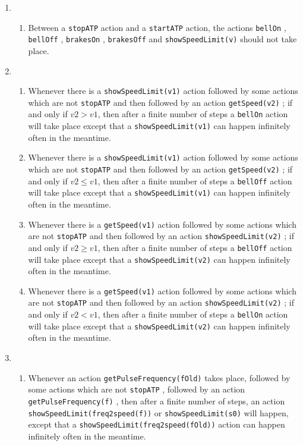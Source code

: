 \documentclass[11pt,a4paper]{article}
\newcommand{\stopATP}{\texttt{stopATP} }
\newcommand{\startATP}{\texttt{startATP} }
\newcommand{\getSpeed}[1]{\texttt{getSpeed(#1)} }
\newcommand{\getPulseFrequency}[1]{\texttt{getPulseFrequency(#1)} }
\newcommand{\showSpeedLimit}[1]{\texttt{showSpeedLimit(#1)} }
\newcommand{\bellOn}{\texttt{bellOn} }
\newcommand{\bellOff}{\texttt{bellOff} }
\newcommand{\brakesOn}{\texttt{brakesOn} }
\newcommand{\brakesOff}{\texttt{brakesOff} }
\begin{document}
\begin{enumerate}
	\item
	\begin{enumerate}
	
	\item Between a \stopATP action and a \startATP action, the actions \bellOn, \bellOff, \brakesOn, \brakesOff and \showSpeedLimit{v} should not take place.
	\end{enumerate}
    \item 
    \begin{enumerate}
    	\item Whenever there is a \showSpeedLimit{v1} action followed by some actions which are not \stopATP and then followed by an action \getSpeed{v2}; if and only if $v2>v1$, then after a finite number of steps a \bellOn action will take place except that a \showSpeedLimit{v1} can happen infinitely often in the meantime.
    	
    	\item Whenever there is a \showSpeedLimit{v1} action followed by some actions which are not \stopATP and then followed by an action \getSpeed{v2}; if and only if $v2 \leq v1$, then after a finite number of steps a \bellOff action will take place except that a \showSpeedLimit{v1} can happen infinitely often in the meantime.
			
			\item Whenever there is a \getSpeed{v1} action followed by some actions which are not \stopATP and then followed by an action \showSpeedLimit{v2}; if and only if $ v2 \geq v1$, then after a finite number of steps a \bellOff action will take place except that a \showSpeedLimit{v2} can happen infinitely often in the meantime.
			
			\item Whenever there is a \getSpeed{v1} action followed by some actions which are not \stopATP and then followed by an action \showSpeedLimit{v2}; if and only if $v2 < v1$, then after a finite number of steps a \bellOn action will take place except that a \showSpeedLimit{v2} can happen infinitely often in the meantime.
    	
    \end{enumerate}
		\item
		\begin{enumerate}
		 
    \item Whenever an action  \getPulseFrequency{fOld} takes place, followed by some actions which are not \stopATP, followed by an action \getPulseFrequency{f}, then after a finite number of steps, an action \showSpeedLimit{freq2speed(f)} or \showSpeedLimit{s0} will happen, except that a \showSpeedLimit{freq2speed(fOld)} action can happen infinitely often in the meantime.
		\end{enumerate}
		

\end{enumerate}
\end{document}
